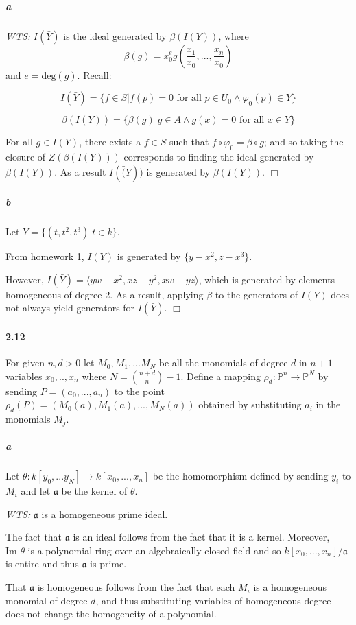 \documentclass{article}
\begin{document}
\subparagraph{a}
\emph{WTS:} $I(\bar{Y})$ is the ideal generated by $\beta(I(Y))$, where
\[ \beta(g) = x_0^e g \left ( \frac{x_1}{x_0}, ... , \frac{x_n}{x_0} \right ) \]
and $e = \textrm{deg}(g)$.  Recall:

\[ I(\bar{Y}) = \{ f \in S | f(p) = 0 \textrm{ for all } p \in U_0 \wedge \varphi_0(p) \in Y \} \]

\[ \beta(I(Y)) =  \{ \beta(g) | g \in A \wedge g(x) = 0 \textrm{ for all } x \in Y \} \]

For all $g \in I(Y)$, there exists a $f \in S$ such that $f \circ \varphi_0 = \beta \circ g$; and so taking the closure of $Z(\beta(I(Y) ))$ corresponds to finding the ideal generated by $\beta(I(Y))$.  As a result $I(\bar(Y))$ is generated by $\beta(I(Y))$. $\Box$

\subparagraph{b}
Let $Y = \{ (t, t^2, t^3) | t \in k \}$.

From homework 1, $I(Y)$ is generated by $\{ y - x^2, z - x^3 \}$.

However, $I(\bar{Y}) = \langle y w - x^2, x z - y^2,  x w - y z \rangle$, which is generated by elements homogeneous of degree 2.  As a result, applying $\beta$ to the generators of $I(Y)$ does not always yield generators for $I(\bar{Y})$. $\Box$

\paragraph{2.12}
For given $n,d > 0$ let $M_0, M_1,... M_N$ be all the monomials of degree $d$ in $n+1$ variables $x_0,..,x_n$ where $N = {n+d \choose n} - 1$.  Define a mapping $\rho_d : \mathbb{P}^n \to \mathbb{P}^N$ by sending $P = (a_0, ... , a_n)$ to the point $\rho_d(P) = (M_0(a), M_1(a), ..., M_N(a))$ obtained by substituting $a_i$ in the monomials $M_j$.

\subparagraph{a}
Let $\theta : k[y_0, ... y_N] \to k[x_0, ..., x_n]$ be the homomorphism defined by sending $y_i$ to $M_i$ and let $\mathfrak{a}$ be the kernel of $\theta$. 

\emph{WTS:} $\mathfrak{a}$ is a homogeneous prime ideal.

The fact that $\mathfrak{a}$ is an ideal follows from the fact that it is a kernel.  Moreover, $\textrm{Im } \theta$ is a polynomial ring over an algebraically closed field and so $k[x_0, ... , x_n] / \mathfrak{a}$ is entire and thus $\mathfrak{a}$ is prime.  

That $\mathfrak{a}$ is homogeneous follows from the fact that each $M_i$ is a homogeneous monomial of degree $d$, and thus substituting variables of homogeneous degree does not change the homogeneity of a polynomial.
\end{document}

